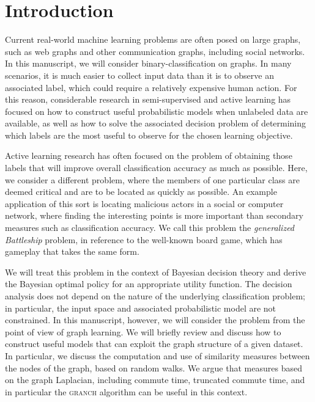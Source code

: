\documentclass{acm_proc_article-sp}
\begin{document}

\section{Introduction}

Current real-world machine learning problems are often posed on large
graphs, such as web graphs and other communication graphs, including
social networks.  In this manuscript, we will consider binary-classification 
on graphs.  In many scenarios, it is much easier to collect input data than 
it is to observe an associated label, which could require a relatively 
expensive human action.  For this reason, considerable research in 
semi-supervised and active learning has focused on how to construct 
useful probabilistic models when unlabeled data are available, as well 
as how to solve the associated decision problem of determining which labels
are the most useful to observe for the chosen learning objective.

Active learning research has often focused on the problem of obtaining
those labels that will improve overall classification accuracy as much
as possible.  Here, we consider a different problem, where the members
of one particular class are deemed critical and are to be located as
quickly as possible.  An example application of this sort is locating
malicious actors in a social or computer network, where finding the
interesting points is more important than secondary measures such as
classification accuracy.  We call this problem the \emph{generalized
  Battleship} problem, in reference to the well-known board game,
which has gameplay that takes the same form.

We will treat this problem in the context of Bayesian decision theory
and derive the Bayesian optimal policy for an appropriate utility
function.  The decision analysis does not depend on the nature of the
underlying classification problem; in particular, the input space and
associated probabilistic model are not constrained.  In this
manuscript, however, we will consider the problem from the point of
view of graph learning.  We will briefly review and discuss how to
construct useful models that can exploit the graph structure of a
given dataset.  In particular, we discuss the computation and use of
similarity measures between the nodes of the graph, based on random
walks.  We argue that measures based on the graph Laplacian, including
commute time, truncated commute time, and in particular the
\textsc{granch} algorithm can be useful in this context.
\end{document}
